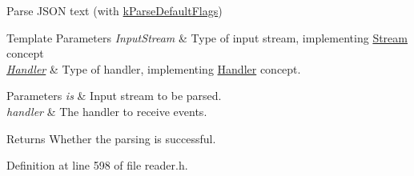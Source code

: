 Parse J\+S\+ON text (with \mbox{\hyperlink{namespacerapidjson_a81379eb4e94a0386d71d15fda882ebc9a5640cb00db7814b7f22be3683dda9835}{k\+Parse\+Default\+Flags}}) 


\begin{DoxyTemplParams}{Template Parameters}
{\em Input\+Stream} & Type of input stream, implementing \mbox{\hyperlink{classrapidjson_1_1_stream}{Stream}} concept \\
\hline
{\em \mbox{\hyperlink{classrapidjson_1_1_handler}{Handler}}} & Type of handler, implementing \mbox{\hyperlink{classrapidjson_1_1_handler}{Handler}} concept. \\
\hline
\end{DoxyTemplParams}

\begin{DoxyParams}{Parameters}
{\em is} & Input stream to be parsed. \\
\hline
{\em handler} & The handler to receive events. \\
\hline
\end{DoxyParams}
\begin{DoxyReturn}{Returns}
Whether the parsing is successful. 
\end{DoxyReturn}


Definition at line 598 of file reader.\+h.


\begin{DoxyCode}{0}

\end{DoxyCode}
\mbox{\label{classrapidjson_1_1_generic_reader_ae1e8b2adc5ebfcb9b123058e4c726b89}} 
